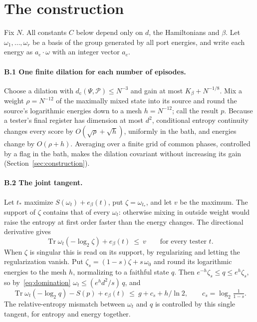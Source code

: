 \documentclass[11pt]{article}
\theoremstyle{definition}
\theoremstyle{remark}
\newcommand{\Tr}{\operatorname{Tr}}
\newcommand{\Kb}{K_\beta}
\newcommand{\Pp}{\mathcal P}
\begin{document}
\section{The construction}\label{app:construction}

Fix $N$. All constants $C$ below depend only on $d$, the Hamiltonians and $\beta$. Let $\omega_1,\dots,\omega_r$ be a basis of the group generated by all port energies, and write each energy as $a_e\cdot\omega$ with an integer vector $a_e$.

\paragraph{B.1 One finite dilation for each number of episodes.} Choose a dilation with $d_{\mathrm c}(\Psi,\Pp)\le N^{-3}$ and gain at most $\Kb+N^{-1/8}$. Mix a weight $\rho=N^{-12}$ of the maximally mixed state into its source and round the source's logarithmic energies down to a mesh $h=N^{-12}$; call the result $p$. Because a tester's final register has dimension at most $d^2$, conditional entropy continuity changes every score by $O(\sqrt\rho+\sqrt h)$, uniformly in the bath, and energies change by $O(\rho+h)$. Averaging over a finite grid of common phases, controlled by a flag in the bath, makes the dilation covariant without increasing its gain (Section~\ref{sec:construction}).

\paragraph{B.2 The joint tangent.} Let $t_*$ maximize $S(\omega_t)+e_\beta(t)$, put $\zeta=\omega_{t_*}$, and let $v$ be the maximum. The support of $\zeta$ contains that of every $\omega_t$: otherwise mixing in outside weight would raise the entropy at first order faster than the energy changes. The directional derivative gives
\[
\Tr\omega_t(-\log_2\zeta)+e_\beta(t)\ \le\ v\qquad\text{for every tester }t.
\]
When $\zeta$ is singular this is read on its support, by regularizing and letting the regularization vanish. Put $\zeta_s=(1-s)\zeta+s\,\omega_0$ and round its logarithmic energies to the mesh $h$, normalizing to a faithful state $q$. Then $e^{-h}\zeta_s\le q\le e^h\zeta_s$, so by~\eqref{eq:domination} $\omega_t\le(e^hd^2/s)\,q$, and
\begin{equation}\label{eq:tangent}
\Tr\omega_t(-\log_2q)-S(p)+e_\beta(t)\ \le\ g+c_s+h/\ln2,\qquad c_s=\log_2\tfrac1{1-s}.
\end{equation}
The relative-entropy mismatch between $\omega_t$ and $q$ is controlled by this single tangent, for entropy and energy together.
\end{document}
